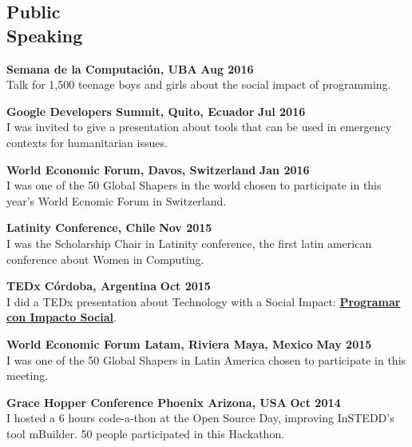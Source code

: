 \documentclass[margin,line]{resume}
\begin{document}
\begin{resume}
\vspace{2mm}
\section{\mysidestyle Public\\Speaking}

\textbf{Semana de la Computaci\'on, UBA} \hfill \textbf{Aug 2016} \vspace{2mm} \\
Talk for 1,500 teenage boys and girls about the social impact of programming.

\textbf{Google Developers Summit, Quito, Ecuador} \hfill \textbf{Jul 2016} \vspace{2mm} \\
I was invited to give a presentation about tools that can be used in emergency contexts for humanitarian issues.

\textbf{World Economic Forum, Davos, Switzerland} \hfill \textbf{Jan 2016} \vspace{2mm} \\
I was one of the 50 Global Shapers in the world chosen to participate in this year's World Ecnomic Forum in Switzerland.

\textbf{Latinity Conference, Chile} \hfill \textbf{Nov 2015} \vspace{2mm} \\
I was the Scholarship Chair in Latinity conference, the first latin american conference about Women in Computing.

\textbf{TEDx C\'ordoba, Argentina} \hfill \textbf{Oct 2015} \vspace{2mm} \\
I did a TEDx presentation about Technology with a Social Impact: \href{https://www.youtube.com/watch?v=0cx8UwdN-g4&t=1s}{\textbf{Programar con Impacto Social}}.

\textbf{World Economic Forum Latam, Riviera Maya, Mexico} \hfill \textbf{May 2015} \vspace{2mm} \\
I was one of the 50 Global Shapers in Latin America chosen to participate in this meeting.

\textbf{Grace Hopper Conference Phoenix Arizona, USA} \hfill \textbf{Oct 2014} \vspace{2mm} \\
I hosted a 6 hours code-a-thon at the Open Source Day, improving InSTEDD's tool mBuilder. 50 people participated in this Hackathon. 


\end{resume}
\end{document}
